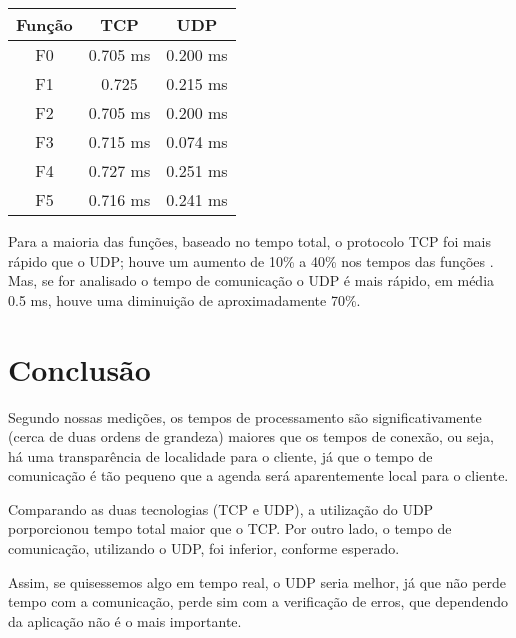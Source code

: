 \documentclass[10pt,a4paper]{article}
\begin{document}
\begin{table}[h!]
  \begin{center}
    \begin{tabular}{ccc}
      
      Função& TCP&  UDP \\
      \hline
      F0 & 0.705 ms & 0.200 ms\\
      F1 & 0.725 & 0.215 ms\\
      F2 & 0.705 ms & 0.200 ms\\
      F3 & 0.715 ms & 0.074 ms\\
      F4 & 0.727 ms & 0.251 ms\\
      F5 & 0.716 ms & 0.241 ms
    \end{tabular}
  \end{center}
\end{table}

Para a maioria das funções, baseado no tempo total, o protocolo TCP
foi mais rápido que o UDP; houve um aumento de 10\% a 40\% nos tempos
das funções . Mas, se for analisado o tempo de
comunicação o UDP é mais rápido, em média 0.5 ms, houve uma diminuição
de aproximadamente 70\%.


\section{Conclusão}
Segundo nossas medições, os tempos de processamento são significativamente (cerca de duas ordens de grandeza)
maiores que os tempos de conexão, ou seja, há uma transparência de localidade para o cliente, já que o tempo de comunicação é tão pequeno que a agenda será aparentemente local para o cliente.

Comparando as duas tecnologias (TCP e UDP), a utilização do UDP porporcionou  tempo total maior que o TCP. 
Por outro lado, o tempo de comunicação, utilizando o UDP, foi inferior, conforme
esperado.

Assim, se quisessemos algo em tempo real, o UDP seria melhor, já que
não perde tempo com a comunicação, perde sim com a verificação de
erros, que dependendo da aplicação não é o mais importante.


\begin{small}
  
\end{small}
\newpage
\end{document}
